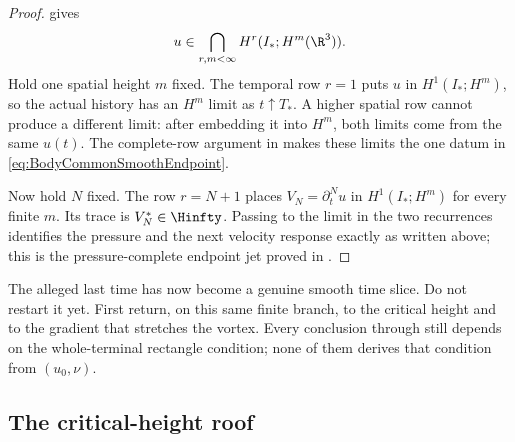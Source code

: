 \begin{proof}
 gives
\[
  u\in\bigcap_{r,m<\infty}H^r(I_*;H^m(\R^3)).
\]
Hold one spatial height \(m\) fixed.  The temporal row \(r=1\) puts \(u\) in
\(H^1(I_*;H^m)\), so the actual history has an \(H^m\) limit as
\(t\uparrow T_*\).  A higher spatial row cannot produce a different limit:
after embedding it into \(H^m\), both limits come from the same \(u(t)\).
The complete-row argument in  makes these
limits the one datum in \eqref{eq:BodyCommonSmoothEndpoint}.

Now hold \(N\) fixed.  The row \(r=N+1\) places
\(V_N=\partial_t^Nu\) in \(H^1(I_*;H^m)\) for every finite \(m\).  Its trace
is \(V_N^*\in\Hinfty\).  Passing to the limit in the two recurrences identifies
the pressure and the next velocity response exactly as written above; this is
the pressure-complete endpoint jet proved in
.
\end{proof}

The alleged last time has now become a genuine smooth time slice.  Do not
restart it yet.  First return, on this same finite branch, to the critical
height and to the gradient that stretches the vortex.  Every conclusion through
 still depends on the whole-terminal
rectangle condition; none of them derives that condition from \((u_0,\nu)\).

\subsection{The critical-height roof}\label{sub:ClassicalContinuationCriteriaInsideFiniteRectangles}

